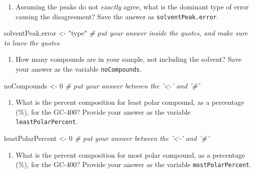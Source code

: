 \documentclass[]{tufte-book}
\newenvironment{Shaded}{}{}
\newcommand{\CommentTok}[1]{\textcolor[rgb]{0.38,0.63,0.69}{\textit{#1}}}
\newcommand{\DecValTok}[1]{\textcolor[rgb]{0.25,0.63,0.44}{#1}}
\newcommand{\NormalTok}[1]{#1}
\newcommand{\StringTok}[1]{\textcolor[rgb]{0.25,0.44,0.63}{#1}}
\providecommand{\tightlist}{%
  \setlength{\itemsep}{0pt}\setlength{\parskip}{0pt}}
\begin{document}
\begin{enumerate}
\def\labelenumi{\arabic{enumi}.}
\setcounter{enumi}{4}
\tightlist
\item
  Assuming the peaks do not \emph{exactly} agree, what is the dominant type of error causing the disagreement? Save the answer as \texttt{solventPeak.error}.
\end{enumerate}

\begin{Shaded}
\begin{Highlighting}[]
\NormalTok{solventPeak.error <-}\StringTok{ "type"}    \CommentTok{# put your answer inside the quotes, and make sure to leave the quotes}
\end{Highlighting}
\end{Shaded}

\begin{enumerate}
\def\labelenumi{\arabic{enumi}.}
\setcounter{enumi}{5}
\tightlist
\item
  How many compounds are in your sample, not including the solvent? Save your answer as the variable \texttt{noCompounds}.
\end{enumerate}

\begin{Shaded}
\begin{Highlighting}[]
\NormalTok{noCompounds <-}\StringTok{ }\DecValTok{0}    \CommentTok{# put your answer between the '<-' and '#'}
\end{Highlighting}
\end{Shaded}

\begin{enumerate}
\def\labelenumi{\arabic{enumi}.}
\setcounter{enumi}{6}
\tightlist
\item
  What is the percent composition for least polar compound, as a percentage (\%), for the GC-400? Provide your answer as the variable \texttt{leastPolarPercent}.
\end{enumerate}

\begin{Shaded}
\begin{Highlighting}[]
\NormalTok{leastPolarPercent <-}\StringTok{ }\DecValTok{0}    \CommentTok{# put your answer between the '<-' and '#'}
\end{Highlighting}
\end{Shaded}

\begin{enumerate}
\def\labelenumi{\arabic{enumi}.}
\setcounter{enumi}{7}
\tightlist
\item
  What is the percent composition for most polar compound, as a percentage (\%), for the GC-400? Provide your answer as the variable \texttt{mostPolarPercent}.
\end{enumerate}
\end{document}
